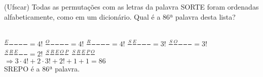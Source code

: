 \begin{ex}
(Ufscar) Todas as permutações com as letras da palavra SORTE foram ordenadas alfabeticamente, como em um dicionário. Qual é a 86ª palavra desta lista?
  \begin{sol}
    \phantom{A} \\
    $\frac{E}{\phantom{A}}\frac{\phantom{A}}{\phantom{A}}\frac{\phantom{A}}{\phantom{A}}\frac{\phantom{A}}{\phantom{A}}\frac{\phantom{A}}{\phantom{A}}= 4!$ \hspace{0,5cm}  $\frac{O}{\phantom{A}}\frac{\phantom{A}}{\phantom{A}}\frac{\phantom{A}}{\phantom{A}}\frac{\phantom{A}}{\phantom{A}}\frac{\phantom{A}}{\phantom{A}}=4!$ \hspace{0,5cm} $\frac{R}{\phantom{A}}\frac{\phantom{A}}{\phantom{A}}\frac{\phantom{A}}{\phantom{A}}\frac{\phantom{A}}{\phantom{A}}\frac{\phantom{A}}{\phantom{A}}=4!$ \hspace{0,5cm} $\frac{S}{\phantom{A}}\frac{E}{\phantom{A}}\frac{\phantom{A}}{\phantom{A}}\frac{\phantom{A}}{\phantom{A}}\frac{\phantom{A}}{\phantom{A}}=3!$ \hspace{0,5cm}  $\frac{S}{\phantom{A}}\frac{O}{\phantom{A}}\frac{\phantom{A}}{\phantom{A}}\frac{\phantom{A}}{\phantom{A}}\frac{\phantom{A}}{\phantom{A}}=3!$ \\
     $\frac{S}{\phantom{A}}\frac{R}{\phantom{A}}\frac{E}{\phantom{A}}\frac{\phantom{A}}{\phantom{A}}\frac{\phantom{A}}{\phantom{A}}=2!$ \hspace{0,5 cm}
     $\frac{S}{\phantom{A}}\frac{R}{\phantom{A}}\frac{E}{\phantom{A}}\frac{O}{\phantom{A}}\frac{P}{\phantom{A}}$ \hspace{0,5cm}
     $\frac{S}{\phantom{A}}\frac{R}{\phantom{A}}\frac{E}{\phantom{A}}\frac{P}{\phantom{A}}\frac{O}{\phantom{A}}$ \\
     $\Longrightarrow  3\cdot4!+2\cdot3! +2!+1+1=86$ \\
     SREPO é a 86ª palavra.
     
  \end{sol}
\end{ex}